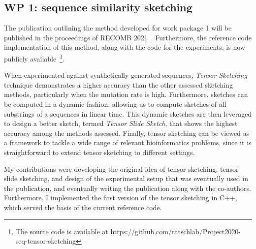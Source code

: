 

\subsection{WP 1: sequence similarity sketching}
The publication outlining the method developed for work package 1 will be published in the proceedings of RECOMB 2021~\cite{joudaki2020fast}. Furthermore, the reference code implementation of this method, along with the code for the experiments, is now publicly available~\footnote{The source code is available at https://github.com/ratschlab/Project2020-seq-tensor-sketching}. 

When experimented against synthetically generated sequences, \emph{Tensor Sketching} technique demonstrates a higher accuracy than the other assessed sketching methods, particularly when the mutation rate is high. Furthermore, sketches can be computed in a dynamic fashion, allowing us to compute sketches of all substrings of a sequences in linear time. This dynamic sketches are then leveraged to design a better sketch, termed \emph{Tensor Slide Sketch}, that shows the highest accuracy among the methods assessed. Finally, tensor sketching can be viewed as a framework to tackle a wide range of relevant bioinformatics problems, since it is straightforward to extend tensor sketching to different settings.

My contributions were developing the original idea of tensor sketching, tensor slide sketching, and design of the experimental setup that was eventually used in the publication, and eventually writing the publication along with the co-authors.  Furthermore, I implemented the first version of the tensor sketching in C++, which served the basis of the current reference code.

